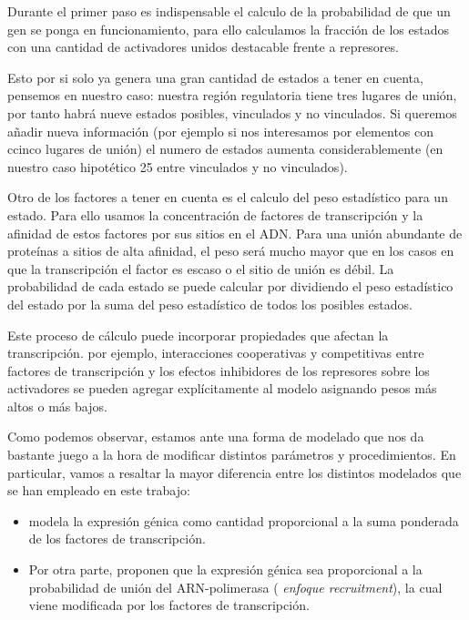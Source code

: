    Durante el primer paso es indispensable el calculo de la probabilidad de que un gen se ponga en funcionamiento, para ello calculamos la fracción de los estados con una cantidad de activadores unidos destacable frente a represores.
   
   Esto por si solo ya genera una gran cantidad de estados a tener en cuenta, pensemos en nuestro caso: nuestra región regulatoria tiene tres lugares de unión, por tanto habrá nueve estados posibles, vinculados y no vinculados. Si queremos añadir nueva información (por ejemplo si nos interesamos por elementos con ccinco lugares de unión) el numero de estados aumenta considerablemente (en nuestro caso hipotético 25 entre vinculados y no vinculados).
 
 
 Otro de los factores a tener en cuenta es el calculo del peso estadístico para un estado. Para ello usamos la concentración de factores de transcripción
 y la afinidad de estos factores por sus sitios en el ADN. Para una unión abundante de proteínas a sitios de alta afinidad, el peso será mucho mayor que en los casos en que la transcripción el factor es escaso o el sitio de unión es débil.
  La probabilidad de cada estado se puede calcular por
 dividiendo el peso estadístico del estado por la suma del peso estadístico de todos los posibles
 estados. 
 
 
 Este proceso de cálculo puede incorporar propiedades que afectan la transcripción. por ejemplo, interacciones cooperativas y competitivas entre factores de transcripción y los efectos inhibidores de los represores sobre los activadores se pueden agregar explícitamente al modelo asignando pesos más altos o más bajos.
 
 Como podemos observar, estamos ante una forma de modelado que nos da bastante juego a la hora de modificar distintos parámetros y procedimientos. En particular, vamos a resaltar la mayor diferencia entre los distintos modelados que se han empleado en este trabajo:
 \begin{itemize}
 	\item \cite{schaffer} modela la expresión génica como cantidad proporcional a la suma ponderada de los factores de transcripción.
 	\item Por otra parte, \cite{cambon1} proponen que la expresión génica sea proporcional a la probabilidad de unión del ARN-polimerasa (\textit{ enfoque recruitment}), la cual viene modificada por los factores de transcripción.
 		
 		
 	\end{itemize}
 
